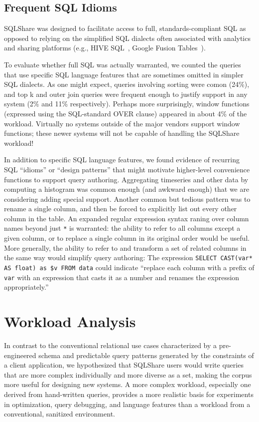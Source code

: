 \documentclass{sig-alternate}
\newcommand{\note}[2]{{\color{#1} {#2}}}
\newcommand{\reviewmeta}[1]{\note{black}{#1}}
\newcommand{\sqlshare}{SQLShare}
\begin{document}
\subsection{Frequent SQL Idioms}
\label{sec:fullsql}
\reviewmeta{\sqlshare{} was designed to facilitate access to full, standards-compliant SQL as opposed to relying on the simplified SQL dialects often associated with analytics and sharing platforms (e.g., HIVE SQL~\cite{hivesql}, Google Fusion Tables~\cite{gonzalez2010google}). 

To evaluate whether full SQL was actually warranted, we counted the queries that use specific SQL language features that are sometimes omitted in simpler SQL dialects.  As one might expect, queries involving sorting were comon (24\%), and top k and outer join queries were frequent enough to justify support in any system (2\% and 11\% respectively).  Perhaps more surprisingly, window functions (expressed using the SQL-standard OVER clause) appeared in about 4\% of the workload. Virtually no systems outside of the major vendors support window functions; these newer systems will not be capable of handling the \sqlshare{} workload!

In addition to specific SQL language features, we found evidence of recurring SQL ``idioms'' or ``design patterns'' that might motivate higher-level convenience functions to support query authoring.  Aggregating timeseries and other data by computing a histogram was common enough (and awkward enough) that we are considering adding special support.  Another common but tedious pattern was to rename a single column, and then be forced to explicitly list out every other column in the table.  An expanded regular expression syntax raning over column names beyond just \texttt{*} is warranted: the ability to refer to all columns except a given column, or to replace a single column in its original order would be useful. More generally, the ability to refer to and transform a set of related columns in the same way would simplify query authoring: The expression \texttt{SELECT CAST(var* AS float) as \$v FROM data} could indicate ``replace each column with a prefix of \texttt{var} with an expression that casts it as a number and renames the expression appropriately.''}

\section{Workload Analysis}
\label{sec:workload}

In contrast to the conventional relational use cases characterized by a pre-engineered schema and predictable query patterns generated by the constraints of a client application, we hypothesized that \sqlshare{} users would write queries that are more complex individually and more diverse as a set, making the corpus more useful for designing new systems.
A more complex workload, especially one derived from hand-written queries, provides a more realistic basis for experiments in optimization, query debugging, and language features than a workload from a conventional, sanitized environment.
\end{document}
